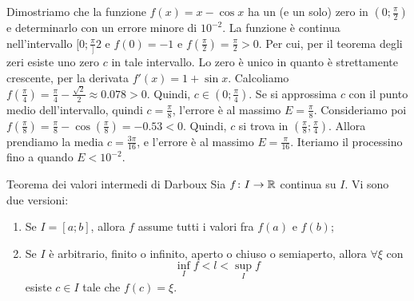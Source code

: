 \documentclass[a4paper]{article}
\begin{document}
\begin{snippetexample}{}
    Dimostriamo che la funzione \(f(x) = x-\cos x\) ha un (e un solo) zero
    in \((0; \frac{\pi}{2})\) e determinarlo con un errore minore di \(10^{-2}\).
    La funzione è continua nell'intervallo \([0; \frac{\pi}]{2}\) e
    \(f(0) = -1\) e \(f(\frac{\pi}{2}) = \frac{\pi}{2} > 0\).
    Per cui, per il teorema degli zeri esiste uno zero \(c\) in tale intervallo.
    Lo zero è unico in quanto è strettamente crescente, per la derivata
    \(f'(x) = 1 + \sin x\).
    Calcoliamo \(f(\frac{\pi}{4}) = \frac{\pi}{4} - \frac{\sqrt{2}}{2} \approx 0.078 > 0\).
    Quindi, \(c\in (0;\frac{\pi}{4})\). Se si approssima \(c\) con il punto medio dell'intervallo,
    quindi \(c=\frac{\pi}{8}\), l'errore è al massimo \(E=\frac{\pi}{8}\).
    Consideriamo poi \(f(\frac{\pi}{8}) = \frac{\pi}{8} - \cos(\frac{\pi}{8}) = -0.53 < 0\).
    Quindi, \(c\) si trova in \((\frac{\pi}{8}; \frac{\pi}{4})\).
    Allora prendiamo la media \(c = \frac{3\pi}{16}\), e l'errore è al massimo
    \(E=\frac{\pi}{16}\). Iteriamo il processino fino a quando \(E < 10^{-2}\).
\end{snippetexample}

\begin{snippettheorem}{Teorema dei valori intermedi di Darboux}
    Sia \(f\colon I \to \mathbb{R}\) continua su \(I\).
    Vi sono due versioni:
    \begin{enumerate}
        \item Se \(I=[a;b]\), allora \(f\) assume tutti i valori fra \(f(a)\) e \(f(b)\);
        \item Se \(I\) è arbitrario, finito o infinito, aperto o chiuso o semiaperto,
        allora \(\forall \xi\) con \[\inf_I f < l < \sup_I f\]
        esiste \(c\in I\) tale che \(f(c) = \xi\).
    \end{enumerate}
\end{snippettheorem}
\end{document}
